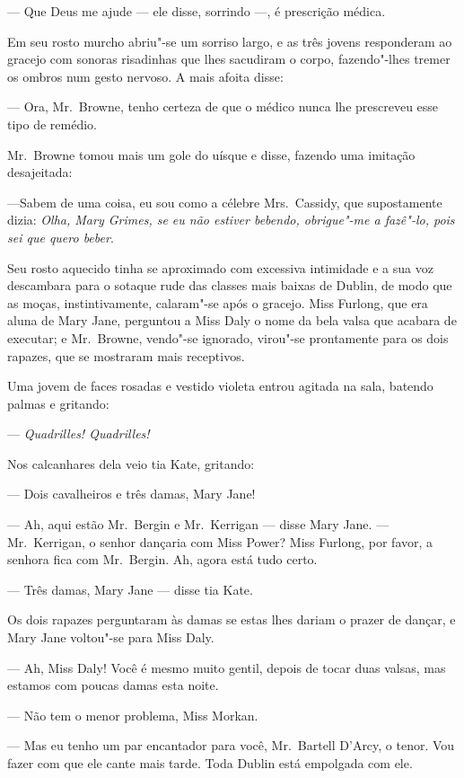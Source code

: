 --- Que Deus me ajude --- ele disse, sorrindo ---, é prescrição médica.

Em seu rosto murcho abriu"-se um sorriso largo, e as três jovens responderam ao
gracejo com sonoras risadinhas que lhes sacudiram o corpo, fazendo"-lhes tremer
os ombros num gesto nervoso.  A mais afoita disse:

--- Ora, Mr.~Browne, tenho certeza de que o médico nunca lhe prescreveu esse
tipo de remédio.

Mr.~Browne tomou mais um gole do uísque e disse, fazendo uma imitação
desajeitada:

---Sabem de uma coisa, eu sou como a célebre Mrs.~Cassidy, que supostamente
dizia: \textit{Olha, Mary Grimes, se eu não estiver bebendo,
obrigue"-me a fazê"-lo, pois sei que quero beber}.

Seu rosto aquecido tinha se aproximado com excessiva intimidade e a sua voz
descambara para o sotaque rude das classes mais baixas de Dublin, de modo que
as moças, instintivamente, calaram"-se após o gracejo.  Miss Furlong, que era
aluna de Mary Jane, perguntou a Miss Daly o nome da bela valsa que acabara de
executar; e Mr.~Browne, vendo"-se ignorado, virou"-se prontamente para os dois
rapazes, que se mostraram mais receptivos.

Uma jovem de faces rosadas e vestido violeta entrou agitada na sala, batendo
palmas e gritando:

--- \textit{Quadrilles!  Quadrilles!}

Nos calcanhares dela veio tia Kate, gritando:

--- Dois cavalheiros e três damas, Mary Jane!

--- Ah, aqui estão Mr.~Bergin e Mr.~Kerrigan --- disse Mary Jane.  --- 
Mr.~Kerrigan, o senhor dançaria com Miss Power?  Miss Furlong, por favor, a senhora
fica com Mr.~Bergin.  Ah, agora está tudo certo.

--- Três damas, Mary Jane --- disse tia Kate.

Os dois rapazes perguntaram às damas se estas lhes dariam o prazer de dançar, e
Mary Jane voltou"-se para Miss Daly.

--- Ah, Miss Daly!  Você é mesmo muito gentil, depois de tocar duas valsas, mas
estamos com poucas damas esta noite.

--- Não tem o menor problema, Miss Morkan.

--- Mas eu tenho um par encantador para você, Mr.~Bartell D’Arcy, o tenor.  Vou
fazer com que ele cante mais tarde.  Toda Dublin está empolgada com ele.

